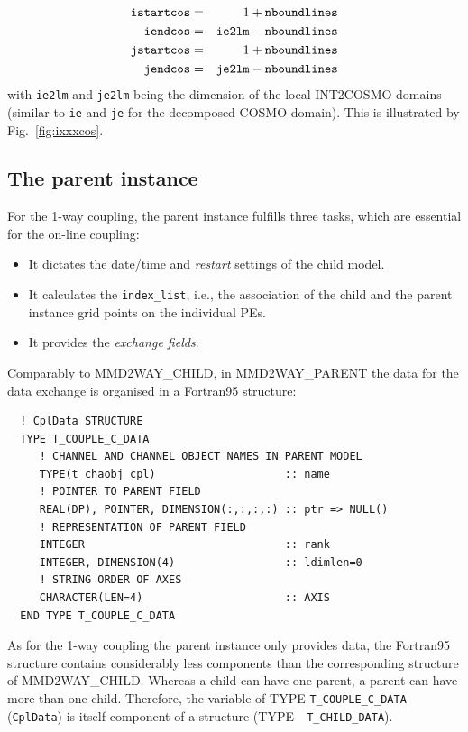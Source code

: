 \documentclass[11pt,twoside]{article}
\begin{document}
\begin{eqnarray*}
\tt istartcos &=& 1 + \tt  nboundlines\\
\tt iendcos &=& \tt ie2lm - \tt  nboundlines\\
\tt jstartcos &=& 1 + \tt  nboundlines\\
\tt jendcos &=&  \tt  je2lm - \tt nboundlines\\
\end{eqnarray*} 
with \verb|ie2lm| and \verb|je2lm| being the dimension of the local INT2COSMO
domains (similar to \verb|ie| and \verb|je| for the decomposed COSMO domain).
This is illustrated by Fig.\ \ref{fig:ixxxcos}.



\subsection{The parent instance\label{sec:c2pParent}}
For the 1-way coupling, the parent instance fulfills three tasks, which are
essential for the on-line coupling: 
\begin{itemize}
\item It dictates the date/time and {\it restart} settings of the child model.
\item It calculates the \verb|index_list|, i.e., the association of the child
and the parent instance grid points on the individual PEs.
\item It provides the {\it exchange fields}.
\end{itemize}

Comparably to MMD2WAY\_CHILD, in MMD2WAY\_PARENT the data for the data
exchange is organised in a Fortran95 structure:

\begin{verbatim}
  ! CplData STRUCTURE
  TYPE T_COUPLE_C_DATA
     ! CHANNEL AND CHANNEL OBJECT NAMES IN PARENT MODEL
     TYPE(t_chaobj_cpl)                    :: name
     ! POINTER TO PARENT FIELD
     REAL(DP), POINTER, DIMENSION(:,:,:,:) :: ptr => NULL()
     ! REPRESENTATION OF PARENT FIELD
     INTEGER                               :: rank
     INTEGER, DIMENSION(4)                 :: ldimlen=0
     ! STRING ORDER OF AXES
     CHARACTER(LEN=4)                      :: AXIS
  END TYPE T_COUPLE_C_DATA
\end{verbatim}
As for the 1-way coupling the parent instance only provides data, the Fortran95
structure contains considerably less components than the corresponding
structure of MMD2WAY\_CHILD.
Whereas a child can have one parent, a parent can have more than one
child.
 Therefore, the variable of {\footnotesize TYPE} \verb|T_COUPLE_C_DATA| 
 (\verb|CplData|) is itself component of a structure 
({\footnotesize TYPE}~\verb| T_CHILD_DATA|).
\end{document}
